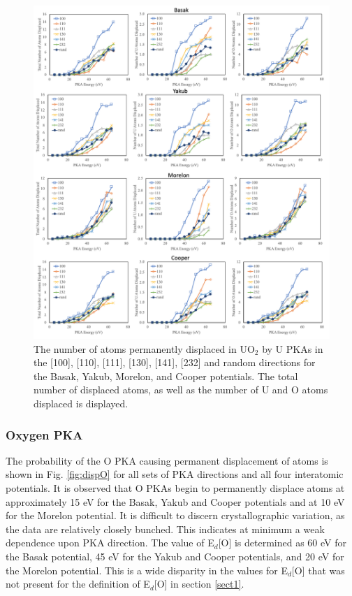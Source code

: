 \documentclass[review]{elsarticle}
\begin{document}
\begin{figure}[h]
 \centering
 \includegraphics[width=1.0\textwidth]{disp_allU.png}
 \caption{The number of atoms permanently displaced in UO$_2$ by U PKAs in the [100], [110], [111], [130], [141], [232] and random directions for the Basak, Yakub, Morelon, and Cooper potentials. The total number of displaced atoms, as well as the number of U and O atoms displaced is displayed.}
 \label{fig:dispall}
\end{figure}

\FloatBarrier

\subsubsection{Oxygen PKA}

The probability of the O PKA causing permanent displacement of atoms is shown in Fig. \ref{fig:dispO} for all sets of PKA directions and all four interatomic potentials. It is observed that O PKAs begin to permanently displace atoms at approximately 15 eV for the Basak, Yakub and Cooper potentials and at 10 eV for the Morelon potential. It is difficult to discern crystallographic variation, as the data are relatively closely bunched. This indicates at minimum a weak dependence upon PKA direction. The value of E$_d$[O] is determined as 60 eV for the Basak potential, 45 eV for the Yakub and Cooper potentials, and 20 eV for the Morelon potential. This is a wide disparity in the values for E$_d$[O] that was not present for the definition of E$_d$[O] in section \ref{sect1}.
\end{document}
